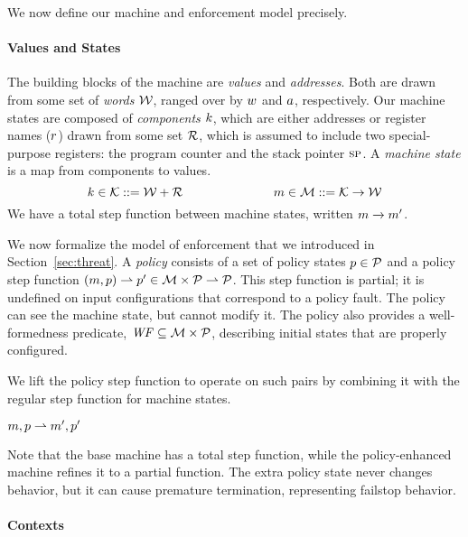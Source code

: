 \documentclass[acmsmall,review,anonymous]{acmart}\settopmatter{printfolios=true,printccs=false,printacmref=false}
\begin{document}
{We now define our machine and enforcement model precisely.

\paragraph*{Values and States}

The building blocks of the machine are {\em values} and {\em addresses}.
Both are drawn from some set of {\em words} \({\mathcal W}\), ranged over by \(w\) and
\(a\), respectively.
%
Our machine states are composed of {\em components} \(k\),
which are either addresses or register names (\(r\)) drawn from some set
\({\mathcal R}\), which is assumed to include two special-purpose registers: the
program counter {\PCname} and the stack pointer \(\textsc{sp}\).
A {\em machine state} is a map from components to values.
%
    \[k \in {\mathcal K} ::= {\mathcal W} + {\mathcal R}  \hspace{1in}
    m \in {\mathcal M} ::= {\mathcal K} \rightarrow {\mathcal W}\]
%
We have a total step function between machine states, written \(m \xrightarrow{} m'\).

We now formalize the model of enforcement that we introduced in Section~\ref{sec:threat}.
A {\em policy} consists of a set of policy
states \(p \in \mathcal{P}\) and a policy step function \((m, p) \rightharpoonup p' \in
{\mathcal M} \times \mathcal{P} \rightharpoonup \mathcal{P}\). This step function is partial;
it is undefined on input configurations that correspond to a policy fault. The policy
can see the machine state, but cannot modify it. The policy also provides a
well-formedness predicate, \(\mathit{WF} \subseteq {\mathcal M} \times \mathcal{P}\), describing
initial states that are properly configured.
%

We lift the policy step function to operate on such pairs
by combining it with the regular step function for machine states.

            {\(m,p \overset{}{\rightharpoonup}
               m',p'\)}

\noindent
Note that the base machine has a total step function, while the policy-enhanced machine
refines it to a partial function. The extra policy state never changes behavior,
but it can cause
premature termination, representing failstop behavior.

\paragraph*{Contexts}

}
\end{document}
